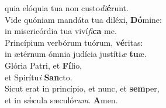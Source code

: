 \evenverse quia elóquia tua non custo\textit{di}\textbf{é}runt.\\
\oddverse Vide quóniam mandáta tua diléxi, \textbf{Dó}mine:~\*\\
\oddverse in misericórdia tua viví\textit{fi}\textbf{ca} me.\\
\evenverse Princípium verbórum tuórum, \textbf{vé}ritas:~\*\\
\evenverse in ætérnum ómnia judícia justíti\textit{æ} \textbf{tu}æ.\\
\oddverse Glória Patri, et \textbf{Fí}lio,~\*\\
\oddverse et Spirítu\textit{i} \textbf{San}cto.\\
\evenverse Sicut erat in princípio, et nunc, et \textbf{sem}per,~\*\\
\evenverse et in sǽcula sæculó\textit{rum}. \textbf{A}men.\\

